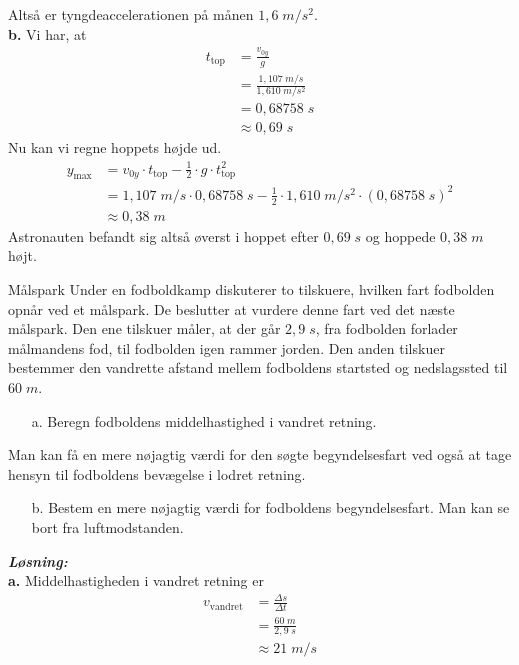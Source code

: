 \documentclass{report}
\newcommand{\sol}{\setlength{\parindent}{0cm}\textbf{\textit{Løsning:}}\setlength{\parindent}{1cm}}
\begin{document}
Altså er tyngdeaccelerationen på månen $1,6 \;\unit{m/s^2} $.\\[1ex]
\textbf{b.}
Vi har, at 
\begin{equation*}
\begin{split}
  t_{\text{top} }&=\frac{v_{0y}}{g}\\ 
  &=\frac{1,107 \;\unit{m/s} }{1,610 \;\unit{m/s^2} }\\ 
  &=0,68758 \;\unit{s} \\ 
  &\approx 0,69 \;\unit{s} 
\end{split}
\end{equation*}
Nu kan vi regne hoppets højde ud.
\begin{equation*}
\begin{split}
  y_{\text{max} }&=v_{0y} \cdot t_{\text{top} } - \frac{1}{2}\cdot g \cdot t_{\text{top} }^2\\ 
  &=1,107 \;\unit{m/s} \cdot 0,68758 \;\unit{s} - \frac{1}{2} \cdot 1,610 \;\unit{m/s^2} \cdot \left(0,68758 \;\unit{s} \right)^2 \\ 
  &\approx 0,38 \;\unit{m} 
\end{split}
\end{equation*}
Astronauten befandt sig altså øverst i hoppet efter $0,69 \;\unit{s} $ og hoppede $0,38 \;\unit{m} $ højt. 
\begin{question}{Målspark}{}
Under en fodboldkamp diskuterer to tilskuere, hvilken fart fodbolden opnår ved et målspark. De beslutter at vurdere denne fart ved det næste målspark. Den ene tilskuer måler, at der går $2,9 \;\unit{s} $, fra fodbolden forlader målmandens fod, til fodbolden igen rammer jorden. Den anden tilskuer bestemmer den vandrette afstand mellem fodboldens startsted og nedslagssted til $60 \;\unit{m} $.
\begin{itemize}
  \item[a.] Beregn fodboldens middelhastighed i vandret retning.
\end{itemize}

Man kan få en mere nøjagtig værdi for den søgte begyndelsesfart ved også at tage hensyn til fodboldens bevægelse i lodret retning.
\begin{itemize}
  \item[b.] Bestem en mere nøjagtig værdi for fodboldens begyndelsesfart. Man kan se bort fra luftmodstanden.
\end{itemize}
\end{question}
\sol \\
\textbf{a.}
Middelhastigheden i vandret retning er
\begin{equation*}
\begin{split}
  v_{\text{vandret} }&=\frac{\Delta s}{\Delta t}\\ 
  &=\frac{60 \;\unit{m} }{2,9 \;\unit{s} }\\ 
  &\approx 21 \;\unit{m/s} 
\end{split}
\end{equation*}
\end{document}
